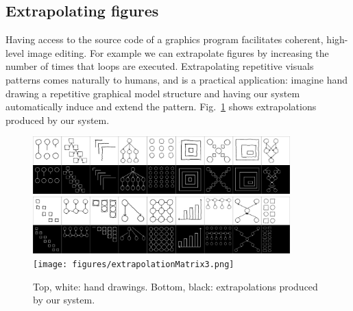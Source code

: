 \documentclass{article}
\newcommand{\remark}[1]{\textcolor{red}{[#1]}}
\theoremstyle{definition}
\begin{document}
\subsection{Extrapolating figures}
Having access to the source code of a graphics program facilitates coherent, high-level image editing.
For example we can extrapolate figures
by increasing the number of times that loops are executed.
Extrapolating repetitive visuals patterns comes naturally to humans,
and is a practical application:
imagine hand drawing a repetitive graphical model structure
and having our system automatically induce and extend the pattern.
Fig.~\ref{extrapolationFigure} shows extrapolations produced by our system.
\begin{figure}[H]\centering
  \includegraphics[width = 0.885\textwidth]{figures/extrapolationMatrix1.png}
  \includegraphics[width = 0.885\textwidth]{figures/extrapolationMatrix2.png}
  \texttt{[image: figures/extrapolationMatrix3.png]}  
   \caption{Top, white: hand drawings. Bottom, black: extrapolations produced by our system.}
  \label{extrapolationFigure}
  \end{figure}
%



\end{document}
